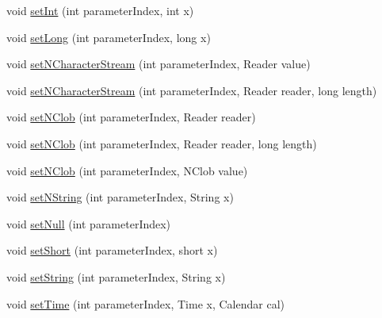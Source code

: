 \begin{DoxyCompactItemize}
\item 
void \mbox{\hyperlink{classcom_1_1mysql_1_1cj_1_1_server_prepared_query_bindings_ad6bd01513aca9fc76b1e7e476ca4e9b2}{set\+Int}} (int parameter\+Index, int x)
\item 
void \mbox{\hyperlink{classcom_1_1mysql_1_1cj_1_1_server_prepared_query_bindings_a44be4a4c225e130dbedba40929d0b6c3}{set\+Long}} (int parameter\+Index, long x)
\item 
void \mbox{\hyperlink{classcom_1_1mysql_1_1cj_1_1_server_prepared_query_bindings_aad5346da528491502560f4fcc5ef0192}{set\+N\+Character\+Stream}} (int parameter\+Index, Reader value)
\item 
void \mbox{\hyperlink{classcom_1_1mysql_1_1cj_1_1_server_prepared_query_bindings_a55138ad85c98d697e5e6df738e1876a5}{set\+N\+Character\+Stream}} (int parameter\+Index, Reader reader, long length)
\item 
void \mbox{\hyperlink{classcom_1_1mysql_1_1cj_1_1_server_prepared_query_bindings_a0ed6559f381bdb4253c9f37d78ced0f3}{set\+N\+Clob}} (int parameter\+Index, Reader reader)
\item 
void \mbox{\hyperlink{classcom_1_1mysql_1_1cj_1_1_server_prepared_query_bindings_ab47c539ceb173224c2c22e987ad2fe9f}{set\+N\+Clob}} (int parameter\+Index, Reader reader, long length)
\item 
void \mbox{\hyperlink{classcom_1_1mysql_1_1cj_1_1_server_prepared_query_bindings_a878777f1d89169e9f1ab98c1d4854f58}{set\+N\+Clob}} (int parameter\+Index, N\+Clob value)
\item 
void \mbox{\hyperlink{classcom_1_1mysql_1_1cj_1_1_server_prepared_query_bindings_a19c4481c4e40a28b993f8e1d69325f6b}{set\+N\+String}} (int parameter\+Index, String x)
\item 
void \mbox{\hyperlink{classcom_1_1mysql_1_1cj_1_1_server_prepared_query_bindings_a3e11a022dac2c5b0a735f452ea8c2588}{set\+Null}} (int parameter\+Index)
\item 
void \mbox{\hyperlink{classcom_1_1mysql_1_1cj_1_1_server_prepared_query_bindings_a6b496d959186ca1943bdc60330cd23ab}{set\+Short}} (int parameter\+Index, short x)
\item 
void \mbox{\hyperlink{classcom_1_1mysql_1_1cj_1_1_server_prepared_query_bindings_ab71256302bcb79547e65d7b0192487a4}{set\+String}} (int parameter\+Index, String x)
\item 
void \mbox{\hyperlink{classcom_1_1mysql_1_1cj_1_1_server_prepared_query_bindings_a36923d88cb42bd53c4a6a6815a757426}{set\+Time}} (int parameter\+Index, Time x, Calendar cal)
\item 

\end{DoxyCompactItemize}
